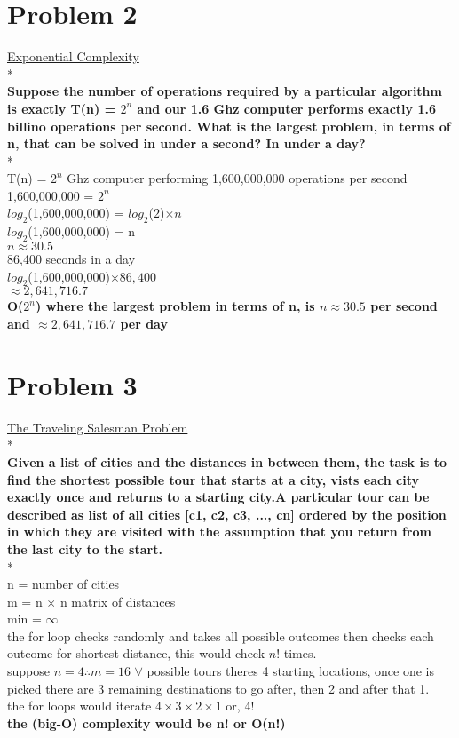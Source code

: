 \documentclass[11pt]{article}
\begin{document}
\begin{itemize}
\section*{Problem 2} 
	{\underline{Exponential Complexity}}\\*\\
	{\bf Suppose the number of operations required by a particular algorithm is exactly T(n) = $2^n$ and our 1.6 Ghz computer performs exactly 1.6 billino operations per second. What is the largest problem, in terms of n, that can be solved in under a second? In under a day?}\\*\\
T(n) = $2^n$  Ghz computer performing 1,600,000,000 operations per second\\
1,600,000,000 = $2^n$\\
$log_{2}$(1,600,000,000) = $log_{2}$($2$)$\times n$\\
$log_{2}$(1,600,000,000) = n\\
$n \approx 30.5$\\
86,400 seconds in a day\\
$log_{2}$(1,600,000,000)$\times 86,400$\\
$\approx 2,641,716.7$ \\
{\bf \color{PineGreen}O($2^n$) where the largest problem in terms of n, is $n \approx 30.5$ per second and $\approx 2,641,716.7$ per day} \pagebreak


\section*{Problem 3} 
	{\underline{The Traveling Salesman Problem}}\\*\\
	{\bf Given a list of cities and the distances in between them, the task is to find the shortest possible tour that starts at a city, vists each city exactly once and returns to a starting city.A particular tour can be described as list of all cities [c1, c2, c3, ..., cn] ordered by the position in which they are visited with the assumption that you return from the last city to the start.}\\*\\
n = number of cities\\
m = n $\times$ n matrix of distances\\
min = $\infty$\\
the for loop checks randomly and takes all possible outcomes then checks each outcome for shortest distance, this would check $n!$ times.\\
suppose $n = 4 \therefore m = 16$ $\forall$ possible tours theres 4 starting locations, once one is picked there are 3 remaining destinations to go after, then 2 and after that 1.\\ the for loops would iterate $4 \times 3 \times 2 \times 1$ or, 4!\\
{\bf \color{PineGreen}the (big-O) complexity would be n! or O(n!)}\\


\end{itemize}
\end{document}
